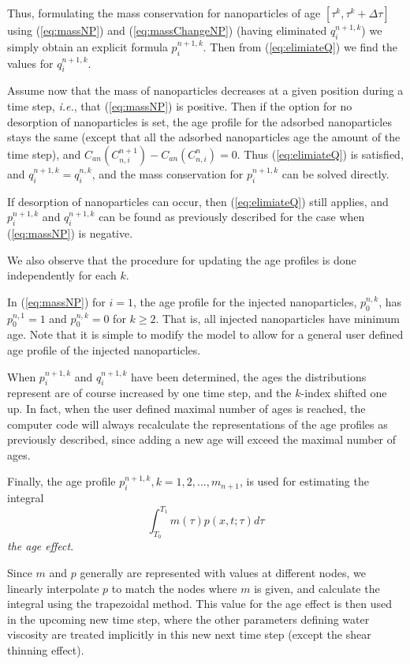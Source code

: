 Thus, formulating the mass conservation for nanoparticles of age $\left[\tau^k, \tau^k+\Delta\tau\right]$ using (\ref{eq:massNP}) and (\ref{eq:massChangeNP}) (having eliminated  $q_i^{n+1,k}$) we simply obtain an explicit formula $p_i^{n+1,k}$. Then from (\ref{eq:elimiateQ}) we find the values for $q_i^{n+1,k}$.

Assume now that the mass of nanoparticles decreases at a given position during a time step, \textit{i.e.}, that (\ref{eq:massNP}) is positive. Then if the option for no desorption of nanoparticles is set, the age profile for the adsorbed nanoparticles stays the same (except that all the adsorbed nanoparticles age the amount of the time step), and $C_{an}(C_{n,i}^{n+1})- C_{an}(C_{n,i}^{n})=0$. Thus (\ref{eq:elimiateQ}) is satisfied, and $q_i^{n+1,k}=q_i^{n,k}$, and the mass conservation for $p_i^{n+1,k}$ can be solved directly.

If desorption of nanoparticles can occur, then (\ref{eq:elimiateQ}) still applies, and $p_i^{n+1,k}$ and  $q_i^{n+1,k}$ can be found as previously described for the case when (\ref{eq:massNP}) is negative. 

We also observe that the procedure for updating the age profiles is done independently for each $k$.

In (\ref{eq:massNP}) for $i=1$, the age profile for the injected nanoparticles, $p_0^{n,k}$, has $p_0^{n,1}=1$ and $p_0^{n,k}=0$ for $k\geq2$. That is, all injected nanoparticles have minimum age. Note that it is simple to modify the model to allow for a general user defined age profile of the injected nanoparticles.

When $p_i^{n+1,k}$ and $q_i^{n+1,k}$ have been determined, the ages the distributions represent are of course increased by one time step, and the  $k$-index shifted one up. In fact, when the user defined maximal number of ages is reached, the computer code will always recalculate the representations of the age profiles as previously described, since adding a new age will exceed the maximal number of ages.

Finally, the age profile $p_i^{n+1,k},k=1,2,...,m_{n+1}$,  is used for estimating the integral
\begin{equation}
    \int_{T_0}^{T_1} m(\tau)p(x,t;\tau)d\tau
\end{equation}
\textit{the age effect}.

Since $m$ and $p$ generally are represented with values at different nodes, we linearly interpolate $p$ to match the nodes where $m$ is given, and calculate the integral using the trapezoidal method. This value for the age effect is then used in the upcoming new time step, where the other parameters defining water viscosity are treated implicitly in this new next time step (except the shear thinning effect).

